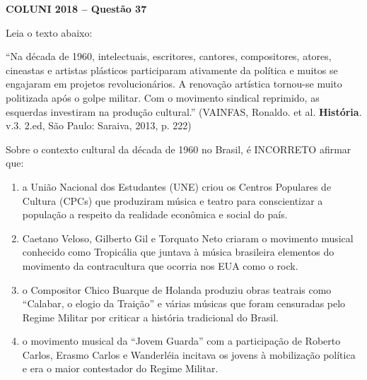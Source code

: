 \textbf{COLUNI 2018 -- Questão 37}\par\medskip Leia o texto abaixo:

\par

“Na década de 1960, intelectuais, escritores, cantores, compositores, atores, cineastas e artistas plásticos participaram ativamente da política e muitos se engajaram em projetos revolucionários. A renovação artística tornou-se muito politizada após o golpe militar. Com o movimento sindical reprimido, as esquerdas investiram na produção cultural.” (VAINFAS, Ronaldo. et al. \textbf{História}. v.3. 2.ed, São Paulo: Saraiva, 2013, p. 222)

\par

Sobre o contexto cultural da década de 1960 no Brasil, é INCORRETO afirmar que:\begin{enumerate}
\item a União Nacional dos Estudantes (UNE) criou os Centros Populares de Cultura (CPCs) que produziram
        música e teatro para conscientizar a população a respeito da realidade econômica e social do país.
\item Caetano Veloso, Gilberto Gil e Torquato Neto criaram o movimento musical conhecido como Tropicália que
        juntava à música brasileira elementos do movimento da contracultura que ocorria nos EUA como o rock.
\item o Compositor Chico Buarque de Holanda produziu obras teatrais como “Calabar, o elogio da Traição” e
        várias músicas que foram censuradas pelo Regime Militar por criticar a história tradicional do Brasil.
\item o movimento musical da “Jovem Guarda” com a participação de Roberto Carlos, Erasmo Carlos e
        Wanderléia incitava os jovens à mobilização política e era o maior contestador do Regime Militar.\end{enumerate}
